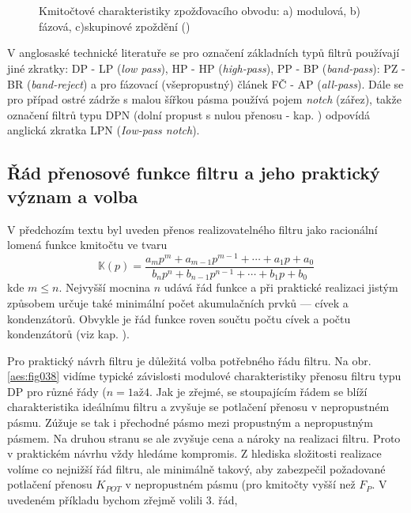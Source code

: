           \begin{figure}[ht!]
            \centering  
                \\
                \\
            \caption{Kmitočtové charakteristiky zpožďovacího obvodu: a) modulová, b) fázová,
                    c)skupinové zpoždění (\cite[s.~36]{HajekSedlacek2002})}
            \label{aes:fig037}
          \end{figure}

          \begin{tcnote}
            V anglosaské technické literatuře se pro označení základních typů filtrů používají jiné
            zkratky: DP - LP (\emph{low pass}), HP - HP (\emph{high-pass}), PP - BP
            (\emph{band-pass}): PZ - BR (\emph{band-reject}) a pro fázovací (všepropustný) článek FČ
            - AP (\emph{all-pass}). Dále se pro případ ostré zádrže s malou šířkou pásma používá
            pojem \emph{notch} (zářez), takže označení filtrů typu DPN (dolní propust s nulou
            přenosu - kap. ) odpovídá anglická zkratka LPN
            (\emph{Iow-pass notch}).            
          \end{tcnote}

    \subsection{Řád přenosové funkce filtru a jeho praktický význam a volba}
      V předchozím textu byl uveden přenos realizovatelného filtru jako racionální lomená funkce
      kmitočtu ve tvaru
      \begin{equation}\label{aes:eq028}
        \mathbb{K}(p) = \frac{a_mp^m + a_{m-1}p^{m-1} + \cdots + a_1p +a_0}
                             {b_np^n + b_{n-1}p^{n-1} + \cdots + b_1p +b_0}
      \end{equation}
      kde \(m\leq n\). Nejvyšší mocnina \(n\) udává řád funkce a při praktické realizaci jistým
      způsobem určuje také minimální počet akumulačních prvků — cívek a kondenzátorů. Obvykle je řád
      funkce roven součtu počtu cívek a počtu kondenzátorů (viz kap. ). 
      
      Pro praktický návrh filtru je důležitá volba potřebného řádu filtru. Na obr. \ref{aes:fig038}
      vidíme typické závislosti modulové charakteristiky přenosu filtru typu DP pro různé řády (\(n
      = 1 \text{až} 4\). Jak je zřejmé, se stoupajícím řádem se blíží charakteristika ideálnímu
      filtru a zvyšuje se potlačení přenosu v nepropustném pásmu. Zúžuje se tak i přechodné pásmo
      mezi propustným a nepropustným pásmem. Na druhou stranu se ale zvyšuje cena a nároky na
      realizaci filtru. Proto v praktickém návrhu vždy hledáme kompromis. Z hlediska složitosti
      realizace volíme co nejnižší řád filtru, ale minimálně takový, aby zabezpečil požadované
      potlačení přenosu \(K_{POT}\) v nepropustném pásmu (pro kmitočty vyšší než \(F_P\). V uvedeném
      příkladu bychom zřejmě volili \num{3}. řád, 

